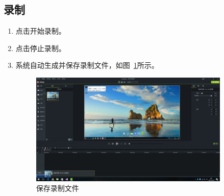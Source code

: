 \documentclass[12pt]{ctexart}
\begin{document}
\subsection{录制}
\begin{enumerate}
\item 点击{\color{blue}{rec}}开始录制。\par
\item 点击{\color{blue}{F10}}停止录制。\par
\item 系统自动生成并保存录制文件，如图~\ref{fig:3.PNG}所示。
    \begin{figure}[!ht]
    \centering
    \includegraphics[width=0.9\textwidth]{3.PNG}
    \caption{保存录制文件}
    \label{fig:3.PNG}
    \end{figure}
\end{enumerate}
\end{document}
